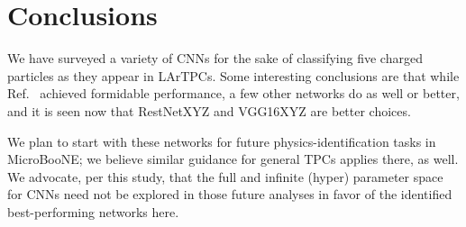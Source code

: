 \documentclass[11pt,a4paper]{article}
\begin{document}
\section {Conclusions}

We have surveyed a variety of CNNs for the sake of classifying five charged particles as they appear in LArTPCs. Some interesting conclusions are that while Ref.~\cite{uB-JINST} achieved formidable performance, a few other networks do as well or better, and it is seen now that RestNetXYZ and VGG16XYZ are better choices.

We plan to start with these networks for future physics-identification tasks in MicroBooNE; we believe similar guidance for general TPCs applies there, as well. We advocate, per this study, that the full and infinite (hyper) parameter space for CNNs need not be explored in those future analyses in favor of the identified best-performing networks here.

\end{document}
